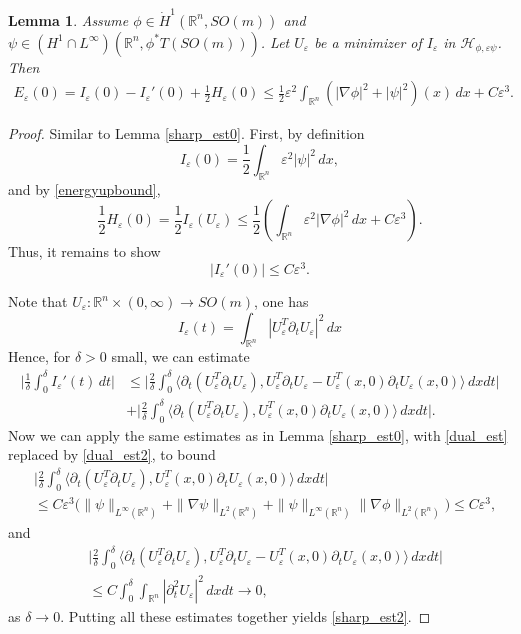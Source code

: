 \documentclass[12pt,twoside,reqno]{amsart}
\newtheorem{lemma}[theorem]{Lemma}
\theoremstyle{definition}              %
\theoremstyle{remark}                  %
\newcommand{\R}{\mathbb{R}}                 %
\newcommand{\eps}{\varepsilon}
\renewcommand{\1}{\mathbbm{1}}                                      %
\numberwithin{equation}{section}
\numberwithin{definition}{section}
\numberwithin{theorem}{section}
\numberwithin{remark}{section}
\begin{document}
\begin{lemma}\label{energyineq2}
Assume $\phi\in \dot{H}^1(\mathbb R^n,SO(m))$ 
and $\psi\in ({H}^1\cap L^\infty)(\mathbb R^n, \phi^*T(SO(m)))$.
Let $U_\eps$ be a minimizer of $I_\eps$ in $\mathcal{H}_{\phi,\eps\psi}$.
Then \begin{align}\label{sharp_est2}
 E_\eps(0)
 =I_\eps(0)-I_\eps'(0)+\frac12 H_\eps(0)\le
 \frac12\eps^2\int_{\mathbb{R}^n}
 (|\nabla\phi|^2+|\psi|^2)(x)\,dx+C\eps^3.
\end{align}
\end{lemma}
\begin{proof} Similar to Lemma \ref{sharp_est0}. First, by definition
\[
I_\eps(0)=\frac12\int_{\R^n}\eps^2|\psi|^2\,dx,
\]
and by \eqref{energyupbound},
\[
\frac12 H_\eps(0)=\frac12 I_\eps(U_\eps)
\le \frac12(\int_{\R^n}\eps^2|\nabla\phi|^2\,dx+C\eps^3).
\]
Thus, it remains to show
\[
|I_\eps'(0)|\le C\eps^3.
\]

Note that $U_\eps:\R^n\times (0,\infty)\to SO(m)$, one has
\[
I_\eps(t)=\int_{\R^n}|U_\eps^T\partial_t U_\eps|^2\,dx
\]
Hence, for $\delta>0$ small, we can estimate
\begin{align*}
\Big|\frac{1}{\delta}\int_0^\delta I_\eps'(t)\,dt\Big|
&\le  
\Big|\frac{2}{\delta}\int_0^{\delta} \langle \partial_t(U_\eps^T\partial_tU_\eps), U_\eps^T\partial_t U_\eps-U_\eps^T(x,0)\partial_t U_\eps(x,0)\rangle\,dxdt\Big|\\
&+
\Big|\frac{2}{\delta}\int_0^{\delta} \langle \partial_t(U_\eps^T\partial_tU_\eps), U_\eps^T(x,0)\partial_t U_\eps(x,0)\rangle\,dxdt\Big|.   
\end{align*}
Now we can apply the same estimates as in Lemma \ref{sharp_est0}, with \eqref{dual_est} replaced by
\eqref{dual_est2}, to bound
\begin{align*}
&\Big|\frac{2}{\delta}\int_0^{\delta} \langle \partial_t(U_\eps^T\partial_tU_\eps), U_\eps^T(x,0)\partial_t U_\eps(x,0)\rangle\,dxdt\Big|\\
&\le C\eps^3 \big(\|\psi\|_{L^\infty(\R^n)} 
+\|\nabla\psi\|_{L^2(\R^n)}+\|\psi\|_{L^\infty(\R^n)}\|\nabla\phi\|_{L^2(\R^n)}\big)\le C\eps^3,
\end{align*}
and
\begin{align*}
&\Big|\frac{2}{\delta}\int_0^{\delta} \big\langle \partial_t(U_\eps^T\partial_tU_\eps), U_\eps^T\partial_t U_\eps-U_\eps^T(x,0)\partial_t U_\eps(x,0)\big\rangle\,dxdt\Big|\\
&\le C\int_0^{\delta}\int_{\R^n}|\partial_t^2 U_\eps|^2\,dxdt\rightarrow 0, 
\end{align*}
as $\delta\to 0$.   Putting all these estimates together yields \eqref{sharp_est2}.
\end{proof}
\end{document}
